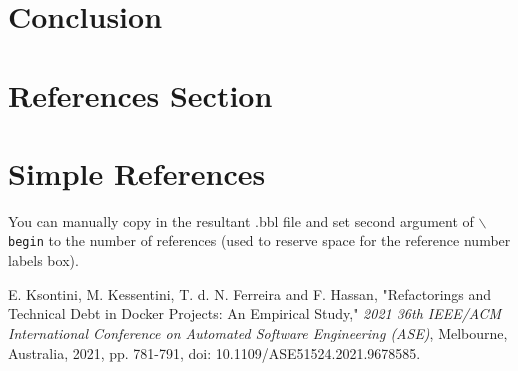 \documentclass[lettersize,journal]{IEEEtran}
\begin{document}
\section{Conclusion}

\section{References Section}
%
\section{Simple References}
You can manually copy in the resultant .bbl file and set second argument of $\backslash${\tt{begin}} to the number of references
 (used to reserve space for the reference number labels box).

\begin{thebibliography}{1}


E. Ksontini, M. Kessentini, T. d. N. Ferreira and F. Hassan, "Refactorings and Technical Debt in Docker Projects: An Empirical Study," \textit{2021 36th IEEE/ACM International Conference on Automated Software Engineering (ASE)}, Melbourne, Australia, 2021, pp. 781-791, doi: 10.1109/ASE51524.2021.9678585.

\end{thebibliography}

\vfill
\end{document}
